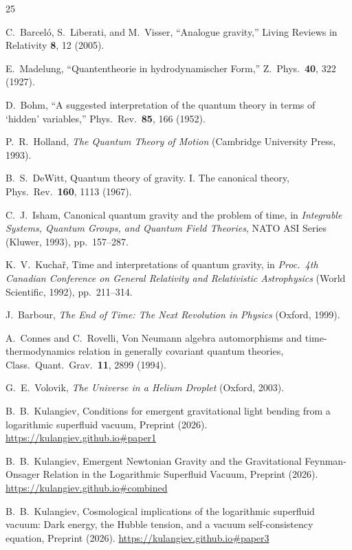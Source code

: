 \documentclass[12pt, a4paper]{article}
\begin{document}
\begin{thebibliography}{25}

C.~Barcel\'{o}, S.~Liberati, and M.~Visser,
``Analogue gravity,''
Living Reviews in Relativity \textbf{8}, 12 (2005).

E.~Madelung,
``Quantentheorie in hydrodynamischer Form,''
Z.\ Phys.\ \textbf{40}, 322 (1927).

D.~Bohm,
``A suggested interpretation of the quantum theory in terms of `hidden' variables,''
Phys.\ Rev.\ \textbf{85}, 166 (1952).

P.~R.~Holland,
\emph{The Quantum Theory of Motion}
(Cambridge University Press, 1993).

B.~S.~DeWitt,
Quantum theory of gravity. I. The canonical theory,
Phys.\ Rev.\ \textbf{160}, 1113 (1967).

C.~J.~Isham,
Canonical quantum gravity and the problem of time,
in \emph{Integrable Systems, Quantum Groups, and
Quantum Field Theories}, NATO ASI Series
(Kluwer, 1993), pp.\ 157--287.

K.~V.~Kucha\v{r},
Time and interpretations of quantum gravity,
in \emph{Proc.\ 4th Canadian Conference on General
Relativity and Relativistic Astrophysics}
(World Scientific, 1992), pp.\ 211--314.

J.~Barbour,
\emph{The End of Time: The Next Revolution in Physics}
(Oxford, 1999).

A.~Connes and C.~Rovelli,
Von Neumann algebra automorphisms and
time-thermodynamics relation in generally covariant
quantum theories,
Class.\ Quant.\ Grav.\ \textbf{11}, 2899 (1994).

G.~E.~Volovik,
\emph{The Universe in a Helium Droplet} (Oxford, 2003).

B.~B.~Kulangiev,
Conditions for emergent gravitational light bending
from a logarithmic superfluid vacuum,
Preprint (2026).
\url{https://kulangiev.github.io#paper1}

B.~B.~Kulangiev,
Emergent Newtonian Gravity and the Gravitational Feynman-Onsager Relation in the Logarithmic Superfluid Vacuum,
Preprint (2026).
\url{https://kulangiev.github.io#combined}

B.~B.~Kulangiev,
Cosmological implications of the logarithmic superfluid
vacuum: Dark energy, the Hubble tension, and a vacuum
self-consistency equation,
Preprint (2026).
\url{https://kulangiev.github.io#paper3}


\end{thebibliography}
\end{document}
